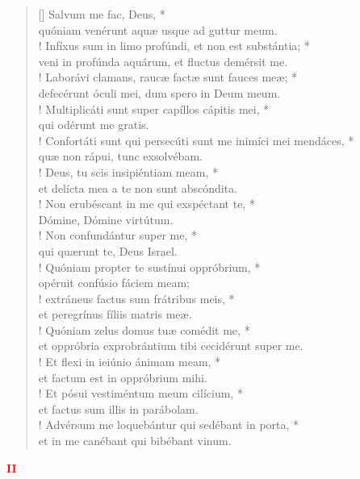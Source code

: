 \begin{verse}[\versewidth]
Salvum me fac, Deus, *\\
quóniam venérunt aquæ usque ad guttur meum.\\!
\vin Infíxus sum in limo profúndi, et non est substántia; *\\
\vin veni in profúnda aquárum, et fluctus demérsit me.\\!
Laborávi clamans, raucæ factæ sunt fauces meæ; *\\
defecérunt óculi mei, dum spero in Deum meum.\\!
\vin Multiplicáti sunt super capíllos cápitis mei, *\\
\vin qui odérunt me gratis.\\!
Confortáti sunt qui persecúti sunt me inimíci mei mendáces, *\\
quæ non rápui, tunc exsolvébam.\\!
\vin Deus, tu scis insipiéntiam meam, *\\
\vin et delícta mea a te non sunt abscóndita.\\!
Non erubéscant in me qui exspéctant te, *\\
Dómine, Dómine virtútum.\\!
\vin Non confundántur super me, *\\
\vin qui quærunt te, Deus Israel.\\!
Quóniam propter te sustínui oppróbrium, *\\
opéruit confúsio fáciem meam;\\!
\vin extráneus factus sum frátribus meis, *\\
\vin et peregrínus fíliis matris meæ.\\!
Quóniam zelus domus tuæ comédit me, *\\
et oppróbria exprobrántium tibi cecidérunt super me.\\!
\vin Et flexi in ieiúnio ánimam meam, *\\
\vin et factum est in oppróbrium mihi.\\!
Et pósui vestiméntum meum cilícium, *\\
et factus sum illis in parábolam.\\!
\vin Advérsum me loquebántur qui sedébant in porta, *\\
\vin et in me canébant qui bibébant vinum.\\
\end{verse}
\begin{center}
\textcolor{red}{\bf II}
\end{center}
